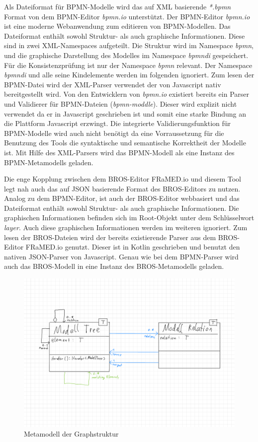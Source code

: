 Als Dateiformat für BPMN-Modelle wird das auf XML basierende \emph{*.bpmn} Format von dem BPMN-Editor \emph{bpmn.io} unterstützt.
Der BPMN-Editor \emph{bpmn.io} ist eine moderne Webanwendung zum editieren von BPMN-Modellen.
Das Dateiformat enthält sowohl Struktur- als auch graphische Informationen.
Diese sind in zwei XML-Namespaces aufgeteilt.
Die Struktur wird im Namespace \emph{bpmn}, und die graphische Darstellung des Modelles im Namespace \emph{bpmndi} gespeichert.
Für die Konsistenzprüfung ist nur der Namespace \emph{bpmn} relevant.
Der Namespace \emph{bpmndi} und alle seine Kindelemente werden im folgenden ignoriert.
Zum lesen der BPMN-Datei wird der XML-Parser verwendet der von Javascript nativ bereitgestellt wird.
Von den Entwicklern von \emph{bpmn.io} existiert bereits ein Parser und Validierer für BPMN-Dateien (\emph{bpmn-moddle}).
Dieser wird explizit nicht verwendet da er in Javascript geschrieben ist und somit eine starke Bindung an die Plattform Javascript erzwingt.
Die integrierte Validierungsfunktion für BPMN-Modelle wird auch nicht benötigt da eine Vorraussetzung für die Benutzung des Tools die syntaktische und semantische Korrektheit der Modelle ist. 
Mit Hilfe des XML-Parsers wird das BPMN-Modell als eine Instanz des BPMN-Metamodells geladen.

Die enge Kopplung zwischen dem BROS-Editor FRaMED.io und diesem Tool legt nah auch das auf JSON basierende Format des BROS-Editors zu nutzen.
Analog zu dem BPMN-Editor, ist auch der BROS-Editor webbasiert und das Dateiformat enthält sowohl Struktur- als auch graphische Informationen.
Die graphischen Informationen befinden sich im Root-Objekt unter dem Schlüsselwort \emph{layer}.
Auch diese graphischen Informationen werden im weiteren ignoriert.
Zum lesen der BROS-Dateien wird der bereits existierende Parser aus dem BROS-Editor FRaMED.io genutzt.
Dieser ist in Kotlin geschrieben und benutzt den nativen JSON-Parser von Javascript.
Genau wie bei dem BPMN-Parser wird auch das BROS-Modell in eine Instanz des BROS-Metamodells geladen.

\begin{figure}
    \centering
    \includegraphics[width=\textwidth,keepaspectratio]{../images/UmlGraph.pdf}%
    \caption{Metamodell der Graphstruktur}%
    \label{fig:UmlGraph}
\end{figure}

